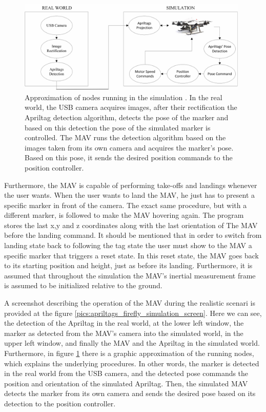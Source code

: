 \begin{figure}
   \centering
   \includegraphics[width=0.98\textwidth]{images/cam_firefly_sim.pdf}
   \caption{Approximation of nodes running in the simulation \protect\footnotemark. In the real world, the USB camera acquires images, after their rectification the Apriltag detection algorithm, detects the pose of the marker and based on this detection the pose of the simulated marker is controlled. The MAV runs the detection algorithm based on the images taken from its own camera and acquires the marker's pose. Based on this pose, it sends the desired position commands to the position controller.}
   \label{pics:mav_demo_camera_rosgraph}
\end{figure}



Furthermore, the MAV is capable of performing take-offs and landings whenever the user wants. When the user wants to land the MAV, he just has to present a specific marker in front of the camera. The exact same procedure, but with a different marker, is followed to make the MAV hovering again. The program stores the last x,y and z coordinates along with the last orientation of The MAV before the landing command. It should be mentioned that in order to switch from landing state back to following the tag state the user must show to the MAV a specific marker that triggers a reset state. In this reset state, the MAV goes back to its starting position and height, just as before its landing. Furthermore, it is assumed that throughout the simulation the MAV's inertial measurement frame is assumed to be initialized relative to the ground.

A screenshot describing the operation of the MAV during the realistic scenari is provided at the figure \ref{pics:apriltags_firefly_simulation_screen}. Here we can see, the detection of the Apriltag in the real world, at the lower left window, the marker as detected from the MAV's camera into the simulated world, in the upper left window, and finally the MAV and the Apriltag in the simulated world. Furthermore, in figure \ref{pics:mav_demo_camera_rosgraph} there is a graphic approximation of the running nodes, which explains the underlying procedures. In other words, the marker is detected in the real world from the USB camera, and the detected pose commands the position and orientation of the simulated Apriltag. Then, the simulated MAV detects the marker from its own camera and sends the desired pose based on its detection to the position controller. 

